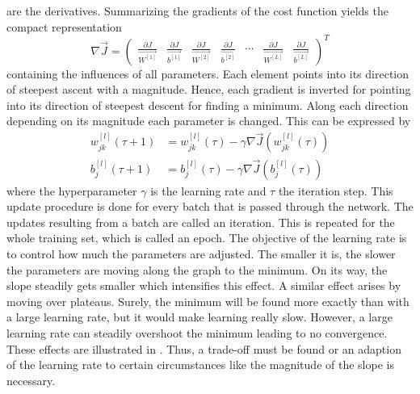 are the derivatives.
Summarizing the gradients of the cost function yields the compact representation
\begin{equation}
	\label{eq:cost-gradient}
	\nabla \vec{J} =
	\begin{pmatrix}
		\frac{\partial J}{\vec{W^{[1]}}} &
		\frac{\partial J}{\vec{b^{[1]}}} &
		\frac{\partial J}{\vec{W^{[2]}}} &
		\frac{\partial J}{\vec{b^{[2]}}} &
		\cdots &
		\frac{\partial J}{\vec{W^{[L]}}} &
		\frac{\partial J}{\vec{b^{[L]}}}
	\end{pmatrix}^T
\end{equation}
containing the influences of all parameters.
Each element points into its direction of steepest ascent with a magnitude.
Hence, each gradient is inverted for pointing into its direction of steepest descent for finding a minimum.
Along each direction depending on its magnitude each parameter is changed.
This can be expressed by
\begin{subequations}
	\label{eq:learning-rate}
	\begin{align}
		w^{[l]}_{jk}(\tau + 1) &= w^{[l]}_{jk}(\tau) - \gamma \nabla \vec{J}(w^{[l]}_{jk}(\tau)) \\
		b^{[l]}_j(\tau + 1) &= b^{[l]}_j(\tau) - \gamma \nabla \vec{J}(b^{[l]}_j(\tau))
	\end{align}
\end{subequations}
where the hyperparameter $\gamma$ is the learning rate and $\tau$ the iteration step.
This update procedure is done for every batch that is passed through the network.
The updates resulting from a batch are called an iteration.
This is repeated for the whole training set, which is called an epoch.
The objective of the learning rate is to control how much the parameters are adjusted.
The smaller it is, the slower the parameters are moving along the graph to the minimum.
On its way, the slope steadily gets smaller which intensifies this effect.
A similar effect arises by moving over plateaus.
Surely, the minimum will be found more exactly than with a large learning rate, but it would make learning really slow.
However, a large learning rate can steadily overshoot the minimum leading to no convergence.
These effects are illustrated in .
Thus, a trade-off must be found or an adaption of the learning rate to certain circumstances like the magnitude of the slope is necessary.
